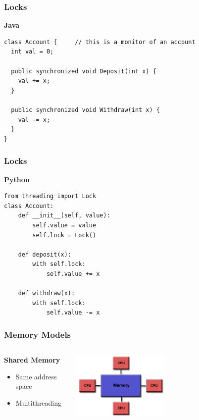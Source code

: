 \documentclass{beamer}
\begin{document}
\begin{frame}[fragile]
\frametitle{Locks}
\textbf{Java}
\begin{verbatim}
class Account {     // this is a monitor of an account
  int val = 0;
 
  public synchronized void Deposit(int x) {
    val += x;
  }
 
  public synchronized void Withdraw(int x) {
    val -= x;
  }
}
\end{verbatim}
\end{frame}

\begin{frame}[fragile]
\frametitle{Locks}
\textbf{Python}
\begin{verbatim}
from threading import Lock
class Account:
    def __init__(self, value):
        self.value = value
        self.lock = Lock()

    def deposit(x):
        with self.lock:
            self.value += x

    def withdraw(x):
        with self.lock:
            self.value -= x
\end{verbatim}
\end{frame}

\begin{frame}
\frametitle{Memory Models}
\begin{columns}
\begin{column}{.4\textwidth}
\textbf{Shared Memory}
\begin{itemize}
  \item Same address space
  \item Multithreading
\end{itemize}
\end{column}

\begin{column}{.6\textwidth}
\includegraphics[width=0.5\textwidth]{img/shared_mem.png} 
\end{column}
\end{columns}
\end{frame}
\end{document}
